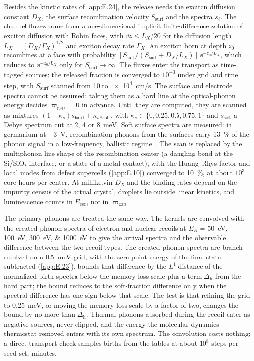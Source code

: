 Besides the kinetic rates of \cref{app:E.24}, the release needs the exciton diffusion constant $D_X$, the surface recombination velocity $S_{\mathrm{surf}}$ and the spectra $s_\ell$. The channel fluxes come from a one-dimensional implicit finite-difference solution of exciton diffusion with Robin faces, with $\dd z \le L_X/20$ for the diffusion length $L_X = (D_X/\varGamma_X)^{1/2}$ and exciton decay rate $\varGamma_X$. An exciton born at depth $z_0$ recombines at a face with probability $[S_{\mathrm{surf}}/(S_{\mathrm{surf}} + D_X/L_X)]\,\ee^{-z_0/L_X}$, which reduces to $\ee^{-z_0/L_X}$ only for $S_{\mathrm{surf}} \to \infty$. The fluxes enter the transport as time-tagged sources; the released fraction is converged to $10^{-3}$ under grid and time step, with $S_{\mathrm{surf}}$ scanned from 10 to \SI{e4}{cm/s}. The surface and electrode spectra cannot be assumed: taking them as a hard line at the optical-phonon energy decides $\varpi_{\mathrm{gap}} = 0$ in advance. Until they are computed, they are scanned as mixtures $(1 - \kappa_s)s_{\mathrm{hard}} + \kappa_s s_{\mathrm{soft}}$, with $\kappa_s \in \{0, 0.25, 0.5, 0.75, 1\}$ and $s_{\mathrm{soft}}$ a Debye spectrum cut at 2, 4 or \SI{8}{meV}. Soft surface spectra are measured: in germanium at $\pm$\SI{3}{V}, recombination phonons from the surfaces carry \SI{13}{\percent} of the phonon signal in a low-frequency, ballistic regime~\cite[Sect.~V\,A]{leman2012invited}. The scan is replaced by the multiphonon line shape of the recombination center (a dangling bond at the Si/SiO$_2$ interface, or a state of a metal contact), with the Huang--Rhys factor and local modes from defect supercells (\cref{app:E.10}) converged to \SI{10}{\percent}, at about $10^3$ core-hours per center. At millikelvin $D_X$ and the binding rates depend on the impurity census of the actual crystal, droplets lie outside linear kinetics, and luminescence counts in $E_{\mathrm{esc}}$, not in $\varpi_{\mathrm{gap}}$.

The primary phonons are treated the same way. The kernels are convolved with the created-phonon spectra of electron and nuclear recoils at $E_R$ = \SIlist{50;100;300;1000}{eV} to give the arrival spectra and the observable difference between the two recoil types. The created-phonon spectra are branch-resolved on a \SI{0.5}{meV} grid, with the zero-point energy of the final state subtracted (\cref{app:E.23}).  bounds that difference by the $L^1$ distance of the normalized birth spectra below the memory-loss scale plus a term $\Delta_{\mathrm{h}}$ from the hard part; the bound reduces to the soft-fraction difference only when the spectral difference has one sign below that scale. The test is that refining the grid to \SI{0.25}{meV}, or moving the memory-loss scale by a factor of two, changes the bound by no more than $\Delta_{\mathrm{h}}$. Thermal phonons absorbed during the recoil enter as negative sources, never clipped, and the energy the molecular-dynamics thermostat removed enters with its own spectrum. The convolution costs nothing; a direct transport check samples births from the tables at about $10^8$ steps per seed set, minutes.

